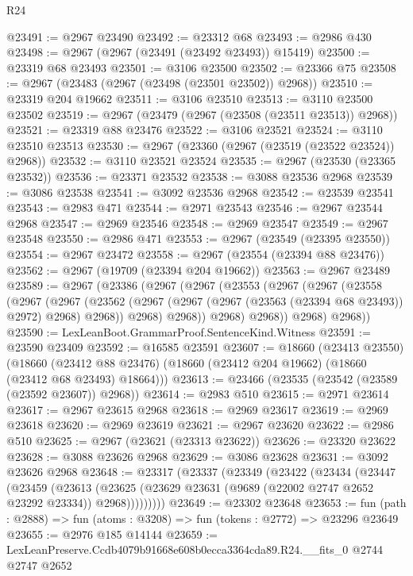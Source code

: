 \begin{lexlean}{R24}
\begin{coremodule}
@23491 := @2967 @23490
@23492 := @23312 @68
@23493 := @2986 @430
@23498 := @2967 (@2967 (@23491 (@23492 @23493)) @15419)
@23500 := @23319 @68 @23493
@23501 := @3106 @23500
@23502 := @23366 @75
@23508 := @2967 (@23483 (@2967 (@23498 (@23501 @23502)) @2968))
@23510 := @23319 @204 @19662
@23511 := @3106 @23510
@23513 := @3110 @23500 @23502
@23519 := @2967 (@23479 (@2967 (@23508 (@23511 @23513)) @2968))
@23521 := @23319 @88 @23476
@23522 := @3106 @23521
@23524 := @3110 @23510 @23513
@23530 := @2967 (@23360 (@2967 (@23519 (@23522 @23524)) @2968))
@23532 := @3110 @23521 @23524
@23535 := @2967 (@23530 (@23365 @23532))
@23536 := @23371 @23532
@23538 := @3088 @23536 @2968
@23539 := @3086 @23538
@23541 := @3092 @23536 @2968
@23542 := @23539 @23541
@23543 := @2983 @471
@23544 := @2971 @23543
@23546 := @2967 @23544 @2968
@23547 := @2969 @23546
@23548 := @2969 @23547
@23549 := @2967 @23548
@23550 := @2986 @471
@23553 := @2967 (@23549 (@23395 @23550))
@23554 := @2967 @23472
@23558 := @2967 (@23554 (@23394 @88 @23476))
@23562 := @2967 (@19709 (@23394 @204 @19662))
@23563 := @2967 @23489
@23589 := @2967
    (@23386
      (@2967
        (@2967
          (@23553
            (@2967
              (@2967
                (@23558
                  (@2967
                    (@2967
                      (@23562
                        (@2967 (@2967 (@2967 (@23563 (@23394 @68 @23493)) @2972) @2968) @2968))
                      @2968)
                    @2968))
                @2968)
              @2968))
          @2968)
        @2968))
@23590 := LexLeanBoot.GrammarProof.SentenceKind.Witness
@23591 := @23590 @23409
@23592 := @16585 @23591
@23607 := @18660
    (@23413 @23550)
    (@18660 (@23412 @88 @23476) (@18660 (@23412 @204 @19662) (@18660 (@23412 @68 @23493) @18664)))
@23613 := @23466 (@23535 (@23542 (@23589 (@23592 @23607)) @2968))
@23614 := @2983 @510
@23615 := @2971 @23614
@23617 := @2967 @23615 @2968
@23618 := @2969 @23617
@23619 := @2969 @23618
@23620 := @2969 @23619
@23621 := @2967 @23620
@23622 := @2986 @510
@23625 := @2967 (@23621 (@23313 @23622))
@23626 := @23320 @23622
@23628 := @3088 @23626 @2968
@23629 := @3086 @23628
@23631 := @3092 @23626 @2968
@23648 := @23317
    (@23337
      (@23349
        (@23422
          (@23434
            (@23447
              (@23459
                (@23613
                  (@23625 (@23629 @23631 (@9689 (@22002 @2747 @2652 @23292 @23334)) @2968)))))))))
@23649 := @23302 @23648
@23653 := fun (path : @2888) => fun (atoms : @3208) => fun (tokens : @2772) => @23296 @23649
@23655 := @2976 @185 @14144
@23659 := LexLeanPreserve.Ccdb4079b91668e608b0ecca3364cda89.R24.__fits_0 @2744 @2747 @2652

\end{coremodule}
\end{lexlean}
